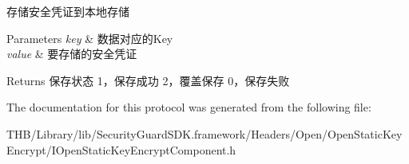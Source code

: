 存储安全凭证到本地存储


\begin{DoxyParams}{Parameters}
{\em key} & 数据对应的\+Key\\
\hline
{\em value} & 要存储的安全凭证\\
\hline
\end{DoxyParams}
\begin{DoxyReturn}{Returns}
保存状态 1，保存成功 2，覆盖保存 0，保存失败 
\end{DoxyReturn}


The documentation for this protocol was generated from the following file\+:\begin{DoxyCompactItemize}
\item 
T\+H\+B/\+Library/lib/\+Security\+Guard\+S\+D\+K.\+framework/\+Headers/\+Open/\+Open\+Static\+Key\+Encrypt/I\+Open\+Static\+Key\+Encrypt\+Component.\+h\end{DoxyCompactItemize}
